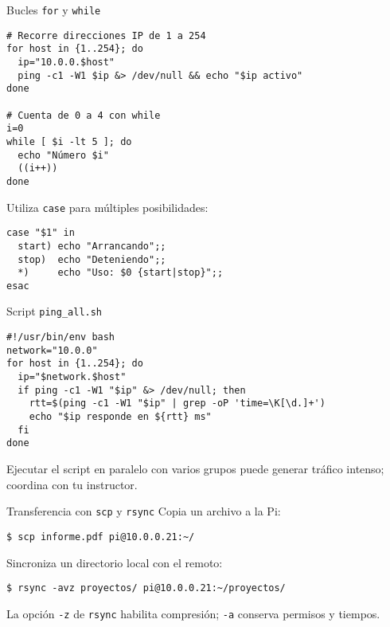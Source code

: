 \documentclass[aspectratio=169,professionalfonts]{beamer}
\begin{document}
\begin{frame}[fragile]{Bucles \texttt{for} y \texttt{while}}
  \begin{verbatim}
# Recorre direcciones IP de 1 a 254
for host in {1..254}; do
  ip="10.0.0.$host"
  ping -c1 -W1 $ip &> /dev/null && echo "$ip activo"
done

# Cuenta de 0 a 4 con while
i=0
while [ $i -lt 5 ]; do
  echo "Número $i"
  ((i++))
done
  \end{verbatim}
  \begin{infobox}
  Utiliza \texttt{case} para múltiples posibilidades:
  \begin{verbatim}
case "$1" in
  start) echo "Arrancando";;
  stop)  echo "Deteniendo";;
  *)     echo "Uso: $0 {start|stop}";;
esac
  \end{verbatim}
  \end{infobox}
\end{frame}

\begin{frame}[fragile]{Script \texttt{ping\_all.sh}}
  \begin{verbatim}
#!/usr/bin/env bash
network="10.0.0"
for host in {1..254}; do
  ip="$network.$host"
  if ping -c1 -W1 "$ip" &> /dev/null; then
    rtt=$(ping -c1 -W1 "$ip" | grep -oP 'time=\K[\d.]+')
    echo "$ip responde en ${rtt} ms"
  fi
done
  \end{verbatim}
  \begin{warnbox}
  Ejecutar el script en paralelo con varios grupos puede generar tráfico intenso; coordina con tu instructor.
  \end{warnbox}
\end{frame}

\begin{frame}[fragile]{Transferencia con \texttt{scp} y \texttt{rsync}}
  Copia un archivo a la Pi:
  \begin{verbatim}
$ scp informe.pdf pi@10.0.0.21:~/
  \end{verbatim}
  Sincroniza un directorio local con el remoto:
  \begin{verbatim}
$ rsync -avz proyectos/ pi@10.0.0.21:~/proyectos/
  \end{verbatim}
  \begin{infobox}
  La opción \texttt{-z} de \texttt{rsync} habilita compresión; \texttt{-a} conserva permisos y tiempos.
  \end{infobox}
\end{frame}
\end{document}
